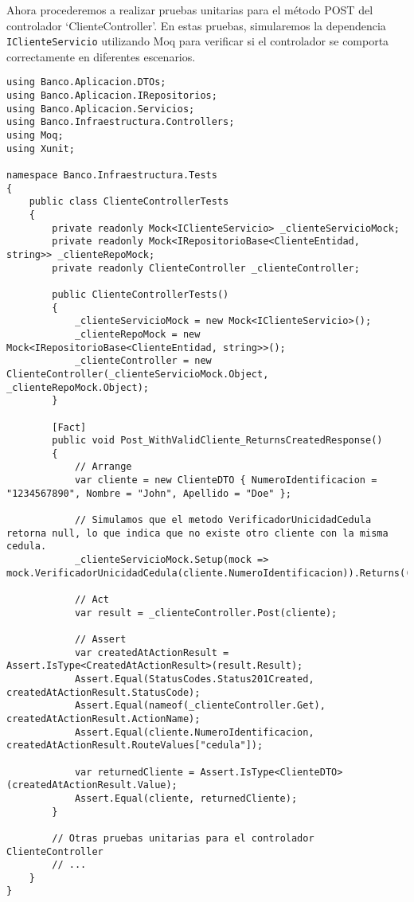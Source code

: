 \documentclass[executivepaper]{article}
\begin{document}
Ahora procederemos a realizar pruebas unitarias para el método POST del controlador \enquote*{ClienteController}. En estas pruebas, simularemos la dependencia \lstinline{IClienteServicio} utilizando Moq para verificar si el controlador se comporta correctamente en diferentes escenarios.

\begin{lstlisting}
using Banco.Aplicacion.DTOs;
using Banco.Aplicacion.IRepositorios;
using Banco.Aplicacion.Servicios;
using Banco.Infraestructura.Controllers;
using Moq;
using Xunit;

namespace Banco.Infraestructura.Tests
{
    public class ClienteControllerTests
    {
        private readonly Mock<IClienteServicio> _clienteServicioMock;
        private readonly Mock<IRepositorioBase<ClienteEntidad, string>> _clienteRepoMock;
        private readonly ClienteController _clienteController;

        public ClienteControllerTests()
        {
            _clienteServicioMock = new Mock<IClienteServicio>();
            _clienteRepoMock = new Mock<IRepositorioBase<ClienteEntidad, string>>();
            _clienteController = new ClienteController(_clienteServicioMock.Object, _clienteRepoMock.Object);
        }

        [Fact]
        public void Post_WithValidCliente_ReturnsCreatedResponse()
        {
            // Arrange
            var cliente = new ClienteDTO { NumeroIdentificacion = "1234567890", Nombre = "John", Apellido = "Doe" };

            // Simulamos que el metodo VerificadorUnicidadCedula retorna null, lo que indica que no existe otro cliente con la misma cedula.
            _clienteServicioMock.Setup(mock => mock.VerificadorUnicidadCedula(cliente.NumeroIdentificacion)).Returns((string)null);

            // Act
            var result = _clienteController.Post(cliente);

            // Assert
            var createdAtActionResult = Assert.IsType<CreatedAtActionResult>(result.Result);
            Assert.Equal(StatusCodes.Status201Created, createdAtActionResult.StatusCode);
            Assert.Equal(nameof(_clienteController.Get), createdAtActionResult.ActionName);
            Assert.Equal(cliente.NumeroIdentificacion, createdAtActionResult.RouteValues["cedula"]);

            var returnedCliente = Assert.IsType<ClienteDTO>(createdAtActionResult.Value);
            Assert.Equal(cliente, returnedCliente);
        }

        // Otras pruebas unitarias para el controlador ClienteController
        // ...
    }
}
\end{lstlisting}
\end{document}
